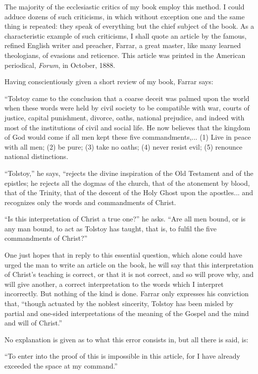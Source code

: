 \documentclass{book}
\begin{document}
The majority of the ecclesiastic critics of my book employ this method. I could adduce dozens of such criticisms, in which without exception one and the same thing is repeated: they speak of everything but the chief subject of the book. As a characteristic example of such criticisms, I shall quote an article by the famous, refined English writer and preacher, Farrar, a great master, like many learned theologians, of evasions and reticence. This article was printed in the American periodical, \emph{Forum}, in October, 1888.

Having conscientiously given a short review of my book, Farrar says:

“Tolstoy came to the conclusion that a coarse deceit was palmed upon the world when these words were held by civil society to be compatible with war, courts of justice, capital punishment, divorce, oaths, national prejudice, and indeed with most of the institutions of civil and social life. He now believes that the kingdom of God would come if all men kept these five commandments,... (1) Live in peace with all men; (2) be pure; (3) take no oaths; (4) never resist evil; (5) renounce national distinctions.

“Tolstoy,” he says, “rejects the divine inspiration of the Old Testament and of the epistles; he rejects all the dogmas of the church, that of the atonement by blood, that of the Trinity, that of the descent of the Holy Ghost upon the apostles... and recognizes only the words and commandments of Christ.

“Is this interpretation of Christ a true one?” he asks. “Are all men bound, or is any man bound, to act as Tolstoy has taught, that is, to fulfil the five commandments of Christ?”

One just hopes that in reply to this essential question, which alone could have urged the man to write an article on the book, he will say that this interpretation of Christ’s teaching is correct, or that it is not correct, and so will prove why, and will give another, a correct interpretation to the words which I interpret incorrectly. But nothing of the kind is done. Farrar only expresses his conviction that, “though actuated by the noblest sincerity, Tolstoy has been misled by partial and one-sided interpretations of the meaning of the Gospel and the mind and will of Christ.”

No explanation is given as to what this error consists in, but all there is said, is:

“To enter into the proof of this is impossible in this article, for I have already exceeded the space at my command.”
\end{document}
